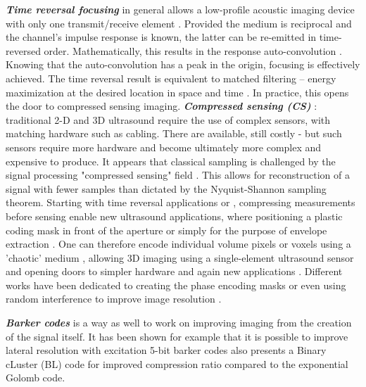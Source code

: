 \documentclass{article}
\begin{document}
\textbf{\textit{Time reversal focusing}} in general allows a low-profile acoustic imaging device with only one transmit/receive element \cite{etaix_acoustic_2012}. Provided the medium is reciprocal and the channel’s impulse response is known, the latter can be re-emitted in time-reversed order. Mathematically, this results in the response auto-convolution \cite{etaix_acoustic_2012}. Knowing that the auto-convolution has a peak in the origin, focusing is effectively achieved. The time reversal result is equivalent to matched filtering – energy maximization at the desired location in space and time \cite{robin_3d_2017}. In practice, this opens the door to compressed sensing imaging. \textbf{\textit{Compressed sensing (CS)}} : traditional 2-D and 3D ultrasound require the use of complex sensors, with matching hardware such as cabling. There are available, still costly - but such sensors require more hardware and become ultimately more complex and expensive to produce. 
It appears that classical sampling is challenged by the signal processing "compressed sensing" field \cite{liutkus_imaging_2014,hua_compressed_2011}. This allows for reconstruction of a signal with fewer samples than dictated by the Nyquist-Shannon sampling theorem. Starting with time reversal applications \cite{montaldo_time_2004, montaldo_building_2005} or \cite{sarvazyan_comparative_2009}, compressing measurements before sensing enable new ultrasound applications, where positioning a plastic coding mask in front of the aperture \cite{fedjajevs_ultrasound_2016} or simply for the purpose of envelope extraction \cite{kim_signal-processing_2020}.  One can therefore encode individual volume pixels or voxels using a 'chaotic' medium  \cite{luong_compact_2016}, allowing 3D imaging using a single-element ultrasound sensor and opening doors to simpler hardware and again new applications \cite{kruizinga_compressive_2017}. Different works have been dedicated to creating the phase encoding masks \cite{van_der_meulen_spatial_2017} or even using random interference to improve image resolution \cite{ni_high-resolution_2020}.

\textbf{\textit{Barker codes}} is a way as well to work on improving imaging from the creation of the signal itself. It has been shown for example that it is possible to improve lateral resolution with excitation 5-bit barker codes \cite{fujita_effect_2017, chun_ultrasound_2015, kim_real-time_2018} also presents a Binary cLuster (BL) code for improved compression ratio compared to the exponential Golomb code.
\end{document}
